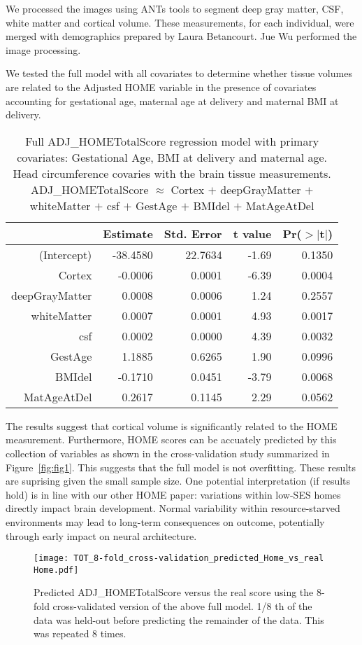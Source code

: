 \documentclass[12pt]{article}
\begin{document}
We processed the images using ANTs tools to segment deep gray matter,
CSF, white matter and cortical volume.   These measurements, for each
individual, were merged with demographics prepared by Laura
Betancourt. Jue Wu performed the image processing.  

We tested the full model with all covariates to determine whether
tissue volumes are related to the Adjusted HOME variable in the
presence of covariates accounting for gestational age, maternal age at
delivery and maternal BMI at delivery.  

\begin{table}[ht]
\centering
\begin{tabular}{rrrrr}
  \hline
 & Estimate & Std. Error & t value & Pr($>$$|$t$|$) \\ 
  \hline
(Intercept) & -38.4580 & 22.7634 & -1.69 & 0.1350 \\ 
  Cortex & -0.0006 & 0.0001 & -6.39 & 0.0004 \\ 
  deepGrayMatter & 0.0008 & 0.0006 & 1.24 & 0.2557 \\ 
  whiteMatter & 0.0007 & 0.0001 & 4.93 & 0.0017 \\ 
  csf & 0.0002 & 0.0000 & 4.39 & 0.0032 \\ 
  GestAge & 1.1885 & 0.6265 & 1.90 & 0.0996 \\ 
  BMIdel & -0.1710 & 0.0451 & -3.79 & 0.0068 \\ 
  MatAgeAtDel & 0.2617 & 0.1145 & 2.29 & 0.0562 \\ 
   \hline
\end{tabular}
\caption{Full ADJ\_HOMETotalScore regression model with primary
  covariates: Gestational Age, BMI at delivery and maternal age.  Head
  circumference covaries with the brain tissue measurements. \newline ADJ\_HOMETotalScore  $\approx$ Cortex $+$  deepGrayMatter  $+$  whiteMatter  $+$ csf  $+$
GestAge  $+$ BMIdel  $+$   MatAgeAtDel}
\end{table}

The results suggest that cortical volume is significantly related to
the HOME measurement.  Furthermore, HOME scores can be accuately
predicted by this collection of variables as shown in the
cross-validation study summarized in Figure~\ref{fig:fig1}.  This
suggests that the full model is not overfitting.  These results are
suprising given the small sample size.  One potential interpretation (if
results hold) is in line with our other HOME paper: variations within
low-SES homes directly impact brain development.  Normal variability within resource-starved environments may lead to
long-term consequences on outcome, potentially through early impact on
neural architecture.

\begin{figure}
    \centering  \texttt{[image: TOT\_8-fold\_cross-validation\_predicted\_Home\_vs\_real Home.pdf]}
    \caption{Predicted ADJ\_HOMETotalScore versus the real score using
      the 8-fold cross-validated version of the above full model.  1/8
    th of the data was held-out before predicting the remainder of the
  data.  This was repeated 8 times. \label{fig:fig1}}
    \label{simulationfigure}
\end{figure}
\end{document}
